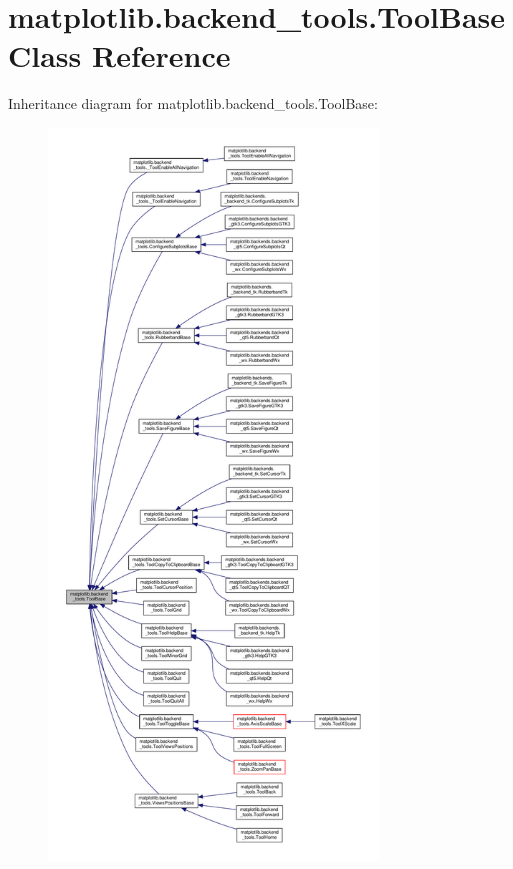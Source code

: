 \hypertarget{classmatplotlib_1_1backend__tools_1_1ToolBase}{}\section{matplotlib.\+backend\+\_\+tools.\+Tool\+Base Class Reference}
\label{classmatplotlib_1_1backend__tools_1_1ToolBase}


Inheritance diagram for matplotlib.\+backend\+\_\+tools.\+Tool\+Base\+:
\nopagebreak
\begin{figure}[H]
\begin{center}
\leavevmode
\includegraphics[height=550pt]{classmatplotlib_1_1backend__tools_1_1ToolBase__inherit__graph}
\end{center}
\end{figure}
